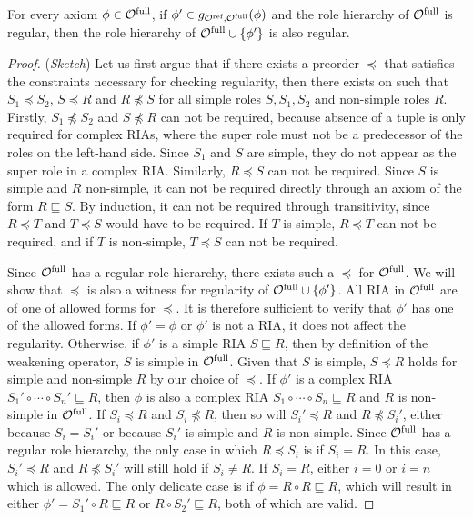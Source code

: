 \documentclass[
]{ceurart}
\begin{document}
\begin{lemma} \label{lem:regularity}
  For every axiom $\phi \in {\mathcal{O}^\textnormal{full}}$, if $\phi' \in g_{{\mathcal{O}^\textnormal{ref}},{\mathcal{O}^\textnormal{full}}}(\phi)$ and the role hierarchy of ${\mathcal{O}^\textnormal{full}}$ is regular, then the role hierarchy of ${\mathcal{O}^\textnormal{full}} \cup \{ \phi' \}$ is also regular.
\end{lemma}

\begin{proof}(\emph{Sketch}) \label{proof:regularity}
  Let us first argue that if there exists a preorder $\preceq$ that satisfies the constraints necessary for checking regularity, then there exists on such that $S_1 \preceq S_2$, $S \preceq R$ and $R \not\preceq S$ for all simple roles $S, S_1, S_2$ and non-simple roles $R$. Firstly, $S_1 \not\preceq S_2$ and $S \not\preceq R$ can not be required, because absence of a tuple is only required for complex RIAs, where the super role must not be a predecessor of the roles on the left-hand side. Since $S_1$ and $S$ are simple, they do not appear as the super role in a complex RIA. Similarly, $R \preceq S$ can not be required. Since $S$ is simple and $R$ non-simple, it can not be required directly through an axiom of the form $R \sqsubseteq S$. By induction, it can not be required through transitivity, since $R \preceq T$ and $T \preceq S$ would have to be required. If $T$ is simple, $R \preceq T$ can not be required, and if $T$ is non-simple, $T \preceq S$ can not be required.

  Since ${\mathcal{O}^\textnormal{full}}$ has a regular role hierarchy, there exists such a $\preceq$ for ${\mathcal{O}^\textnormal{full}}$. We will show that $\preceq$ is also a witness for regularity of ${\mathcal{O}^\textnormal{full}} \cup \{ \phi' \}$. All RIA in ${\mathcal{O}^\textnormal{full}}$ are of one of allowed forms for $\preceq$. It is therefore sufficient to verify that $\phi'$ has one of the allowed forms.
  If $\phi' = \phi$ or $\phi'$ is not a RIA, it does not affect the regularity.
  Otherwise, if $\phi'$ is a simple RIA $S \sqsubseteq R$, then by definition of the weakening operator, $S$ is simple in ${\mathcal{O}^\textnormal{full}}$. Given that $S$ is simple, $S \preceq R$ holds for simple and non-simple $R$ by our choice of $\preceq$.
  If $\phi'$ is a complex RIA $S_1' \circ \cdots \circ S_n' \sqsubseteq R$, then $\phi$ is also a complex RIA $S_1 \circ \cdots \circ S_n \sqsubseteq R$ and $R$ is non-simple in ${\mathcal{O}^\textnormal{full}}$. If $S_i \preceq R$ and $S_i \not\preceq R$, then so will $S_i' \preceq R$ and $R \not\preceq S_i'$, either because $S_i = S_i'$ or because $S_i'$ is simple and $R$ is non-simple. Since ${\mathcal{O}^\textnormal{full}}$ has a regular role hierarchy, the only case in which $R \preceq S_i$ is if $S_i = R$. In this case, $S_i' \preceq R$ and $R \not\preceq S_i'$ will still hold if $S_i \not= R$. If $S_i = R$, either $i = 0$ or $i = n$ which is allowed. The only delicate case is if $\phi = R \circ R \sqsubseteq R$, which will result in either $\phi' = S_1' \circ R \sqsubseteq R$ or $R \circ S_2' \sqsubseteq R$, both of which are valid.
\end{proof}
\end{document}
